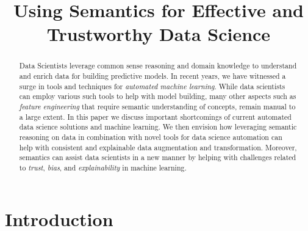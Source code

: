 \documentclass[sigconf]{acmart}
\begin{document}
\title{Using Semantics for Effective and Trustworthy Data Science}


\begin{abstract}
 Data Scientists leverage common sense reasoning and domain knowledge to understand and enrich data for building predictive models. In recent years, we have witnessed a surge in tools and techniques for {\em automated machine learning}. While data scientists can employ various such tools to help with model building, many other aspects such as {\em feature engineering} that require semantic understanding of concepts, remain manual to a large extent. 
  In this paper we discuss important shortcomings of current automated data science solutions and machine learning. We then envision how leveraging semantic reasoning on data in combination with novel tools for data science automation can help with consistent and explainable data augmentation and transformation. Moreover, semantics can assist data scientists in a new manner by helping with challenges related to {\em trust}, {\em bias}, and {\em explainability} in machine learning.
\end{abstract}



\maketitle

\section{Introduction}
\end{document}
